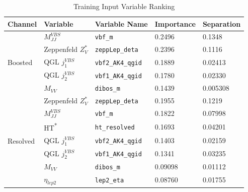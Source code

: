 \begin{table}[!ht]
  \centering
  \caption{Training Input Variable Ranking}
  \begin{tabular}{lllll}%
    \toprule
    Channel & Variable                   & Variable Name        & Importance & Separation \\
    \midrule
    \multirow{5}{*}{Boosted}
            & \( M_{JJ}^{VBS} \)         & \verb|vbf_m|         & 0.2496     & 0.1348     \\
            & Zeppenfeld \( Z_{V}^{*} \) & \verb|zeppLep_deta|  & 0.2396     & 0.1116     \\
            & QGL \( j_{1}^{VBS} \)      & \verb|vbf2_AK4_qgid| & 0.1889     & 0.02413    \\
            & QGL \( j_{2}^{VBS} \)      & \verb|vbf1_AK4_qgid| & 0.1780     & 0.02330    \\
            & \( M_{VV} \)               & \verb|dibos_m|       & 0.1439     & 0.005308   \\
    \midrule
    \multirow{7}{*}{Resolved}
            & Zeppenfeld \( Z_{V}^{*} \) & \verb|zeppLep_deta|  & 0.1955     & 0.1219     \\
            & \( M_{JJ}^{VBS} \)         & \verb|vbf_m|         & 0.1822     & 0.07998    \\
            & HT\textsuperscript{*}      & \verb|ht_resolved|   & 0.1693     & 0.04201    \\
            & QGL \( j_{1}^{VBS} \)      & \verb|vbf2_AK4_qgid| & 0.1403     & 0.02159    \\
            & QGL \( j_{2}^{VBS} \)      & \verb|vbf1_AK4_qgid| & 0.1341     & 0.03235    \\
            & \( M_{VV} \)               & \verb|dibos_m|       & 0.09098    & 0.01112    \\
            & \( \eta_{lep2} \)          & \verb|lep2_eta|      & 0.08760    & 0.01755    \\
    \bottomrule
  \end{tabular}\label{tab:training-input-rank}
\end{table}

